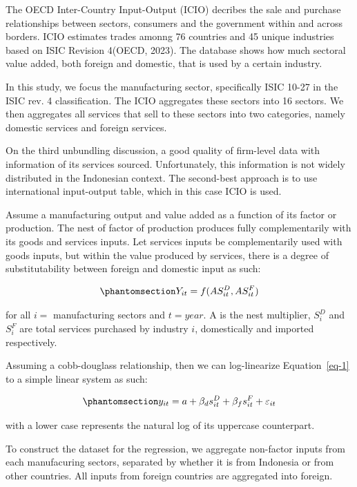 \documentclass[
  a4paper,
  DIV=11,
  numbers=noendperiod]{scrreprt}
\begin{document}
The OECD Inter-Country Input-Output (ICIO) decribes the sale and
purchase relationships between sectors, consumers and the government
within and across borders. ICIO estimates trades amonng 76 countries and
45 unique industries based on ISIC Revision 4(OECD, 2023). The database
shows how much sectoral value added, both foreign and domestic, that is
used by a certain industry.

In this study, we focus the manufacturing sector, specifically ISIC
10-27 in the ISIC rev. 4 classification. The ICIO aggregates these
sectors into 16 sectors. We then aggregates all services that sell to
these sectors into two categories, namely domestic services and foreign
services.

On the third unbundling discussion, a good quality of firm-level data
with information of its services sourced. Unfortunately, this
information is not widely distributed in the Indonesian context. The
second-best approach is to use international input-output table, which
in this case ICIO is used.

Assume a manufacturing output and value added as a function of its
factor or production. The nest of factor of production produces fully
complementarily with its goods and services inputs. Let services inputs
be complementarily used with goods inputs, but within the value produced
by services, there is a degree of substitutability between foreign and
domestic input as such:

\begin{equation}\phantomsection\label{eq-1}{
Y_{it}=f(AS^D_{it},AS^F_{it})
}\end{equation}

for all \(i=\) manufacturing sectors and \(t=year\). A is the nest
multiplier, \(S^D_i\) and \(S^F_i\) are total services purchased by
industry \(i\), domestically and imported respectively.

Assuming a cobb-douglass relationship, then we can log-linearize
Equation~\ref{eq-1} to a simple linear system as such:

\begin{equation}\phantomsection\label{eq-2}{
y_{it}=a+\beta_d s^D_{it}+\beta_f s^F_{it}+\varepsilon_{it}
}\end{equation}

with a lower case represents the natural log of its uppercase
counterpart.

To construct the dataset for the regression, we aggregate non-factor
inputs from each manufacuring sectors, separated by whether it is from
Indonesia or from other countries. All inputs from foreign countries are
aggregated into foreign.
\end{document}
